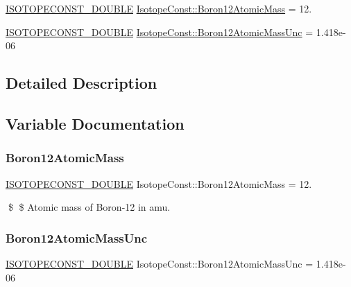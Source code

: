 \begin{DoxyCompactItemize}
\item 
\mbox{\hyperlink{group___isotope_const-_macros_ga8f45a7272ce02c0b4c65c44636ed719a}{I\+S\+O\+T\+O\+P\+E\+C\+O\+N\+S\+T\+\_\+\+D\+O\+U\+B\+LE}} \mbox{\hyperlink{group___isotope_const-_boron-_b12_ga4266703a27b4da16dd24e577e8fcdcd6}{Isotope\+Const\+::\+Boron12\+Atomic\+Mass}} = 12.
\item 
\mbox{\hyperlink{group___isotope_const-_macros_ga8f45a7272ce02c0b4c65c44636ed719a}{I\+S\+O\+T\+O\+P\+E\+C\+O\+N\+S\+T\+\_\+\+D\+O\+U\+B\+LE}} \mbox{\hyperlink{group___isotope_const-_boron-_b12_gabeef2fdeb1a6658b81b9b1238d8e32d5}{Isotope\+Const\+::\+Boron12\+Atomic\+Mass\+Unc}} = 1.\+418e-\/06
\end{DoxyCompactItemize}


\subsection{Detailed Description}


\subsection{Variable Documentation}
\mbox{\label{group___isotope_const-_boron-_b12_ga4266703a27b4da16dd24e577e8fcdcd6}} 
\subsubsection{\texorpdfstring{Boron12\+Atomic\+Mass}{Boron12AtomicMass}}
{\footnotesize\ttfamily \mbox{\hyperlink{group___isotope_const-_macros_ga8f45a7272ce02c0b4c65c44636ed719a}{I\+S\+O\+T\+O\+P\+E\+C\+O\+N\+S\+T\+\_\+\+D\+O\+U\+B\+LE}} Isotope\+Const\+::\+Boron12\+Atomic\+Mass = 12.}

\$ \$ Atomic mass of Boron-\/12 in amu. \mbox{\label{group___isotope_const-_boron-_b12_gabeef2fdeb1a6658b81b9b1238d8e32d5}} 
\subsubsection{\texorpdfstring{Boron12\+Atomic\+Mass\+Unc}{Boron12AtomicMassUnc}}
{\footnotesize\ttfamily \mbox{\hyperlink{group___isotope_const-_macros_ga8f45a7272ce02c0b4c65c44636ed719a}{I\+S\+O\+T\+O\+P\+E\+C\+O\+N\+S\+T\+\_\+\+D\+O\+U\+B\+LE}} Isotope\+Const\+::\+Boron12\+Atomic\+Mass\+Unc = 1.\+418e-\/06}

